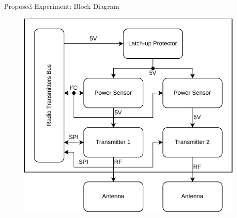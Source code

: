 \begin{frame}{Proposed Experiment: Block Diagram}

    \begin{figure}[!ht]
        \begin{center}
            \includegraphics[scale=0.55]{figures/radios-block-diagram}
        \end{center}
    \end{figure}

\end{frame}
